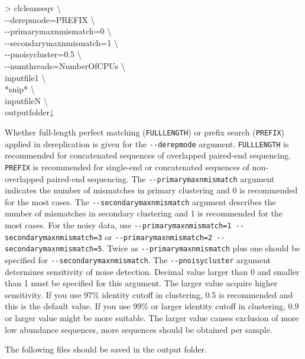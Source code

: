 \documentclass[titlepage,10pt,a4paper,english]{jsbook}
\newenvironment{cmd}{\begin{oframed}\raggedright\ttfamily\footnotesize\setlength{\baselineskip}{1.4em}}{\end{oframed}\vspace{-1em}}
\begin{document}
\begin{cmd}
{\textgreater} clcleanseqv {\textbackslash}\\
{-}{-}derepmode=PREFIX {\textbackslash}\\
{-}{-}primarymaxnmismatch=0 {\textbackslash}\\
{-}{-}secondarymaxnmismatch=1 {\textbackslash}\\
{-}{-}pnoisycluster=0.5 {\textbackslash}\\
{-}{-}numthreads=NumberOfCPUs {\textbackslash}\\
inputfile1 {\textbackslash}\\
*snip* {\textbackslash}\\
inputfileN {\textbackslash}\\
outputfolder↓
\end{cmd}

Whether full-length perfect matching (\texttt{FULLLENGTH}) or prefix search (\texttt{PREFIX}) applied in dereplication is given for the \texttt{{-}{-}derepmode} argument.
\texttt{FULLLENGTH} is recommended for concatenated sequences of overlapped paired-end sequencing.
\texttt{PREFIX} is recommended for single-end or concatenated sequences of non-overlapped paired-end sequencing.
The \texttt{{-}{-}primarymaxnmismatch} argument indicates the number of mismatches in primary clustering and 0 is recommended for the most cases.
The \texttt{{-}{-}secondarymaxnmismatch} argument describes the number of mismatches in secondary clustering and 1 is recommended for the most cases.
For the noisy data, use \texttt{{-}{-}primarymaxnmismatch=1 {-}{-}secondarymaxnmismatch=3} or \texttt{{-}{-}primarymaxnmismatch=2 {-}{-}secondarymaxnmismatch=5}.
Twice as \texttt{{-}{-}primarymaxnmismatch} plus one should be specified for \texttt{{-}{-}secondarymaxnmismatch}.
The \texttt{{-}{-}pnoisycluster} argument determines sensitivity of noise detection.
Decimal value larger than 0 and smaller than 1 must be specified for this argument.
The larger value acquire higher sensitivity.
If you use 97\% identity cutoff in clustering, 0.5 is recommended and this is the default value.
If you use 99\% or larger identity cutoff in clustering, 0.9 or larger value might be more suitable.
The larger value causes exclusion of more low abundance sequences, more sequences should be obtained per sample.

The following files should be saved in the output folder.
\end{document}
